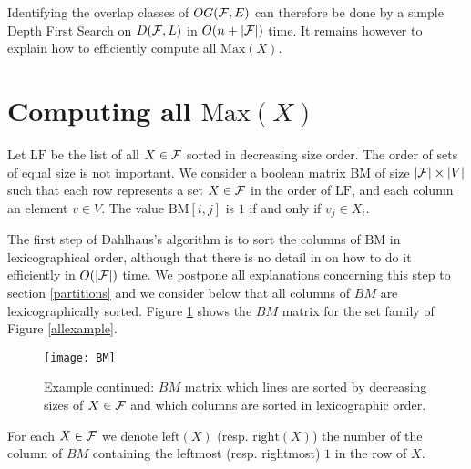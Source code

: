 \documentclass{llncs}
\begin{document}
Identifying the overlap classes of $OG({\cal F},E)$ can therefore be
done by a simple Depth First Search on $D({\cal F},L)$ in $O(n+|{\cal
  F}|)$ time. It remains however to explain how to efficiently compute
all $\mbox{Max}(X).$


\section{Computing all $\mbox{Max}(X)$}

Let $\mbox{LF}$ be the list of all $X \in {\cal F}$ sorted in
decreasing size order. The order of sets of equal size is not
important. We consider a boolean matrix $\mbox{BM}$ of size $|{\cal
F}|\times |V|$ such that each row represents a set $X\in {\cal F}$
in the order of $\mbox{LF}$, and each column an element $v \in V.$ The
value $\mbox{BM}[i,j]$ is $1$ if and only if $v_j \in X_i.$

The first step of Dahlhaus's algorithm is to sort the columns of
$\mbox{BM}$ in lexicographical order, although that there is no detail
in \cite{Dahlhaus00} on how to do it efficiently in $O(|{\cal F}|)$
time. We postpone all explanations concerning this step to section
\ref{partitions} and we consider below that all columns of $BM$ are
lexicographically sorted. Figure \ref{matrix} shows the $BM$ matrix
for the set family of Figure \ref{allexample}.

\begin{figure}[htb]
\vspace{-0.3cm}
  \centering
\texttt{[image: BM]}
\caption{Example continued: $BM$ matrix which lines are sorted by
decreasing sizes of $X\in {\cal F}$ and which columns are sorted in lexicographic order.}
 \label{matrix}
\vspace{-0.3cm}
\end{figure}

For each $X \in {\cal F}$ we denote $\mbox{left}(X)$
(resp. $\mbox{right}(X)$) the number of the column of $BM$ containing the
leftmost (resp. rightmost) $1$ in the row of $X$.
\end{document}
